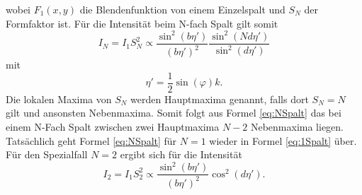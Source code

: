 wobei $F_1(x,y)$ die Blendenfunktion von einem Einzelspalt und $S_N$ der Formfaktor ist.
Für die Intensität beim N-fach Spalt gilt somit
\begin{equation}
	I_N = I_1 S_N^2 \propto \frac{\sin^2(b \eta')}{(b\eta')^2}\frac{\sin^2(N d \eta')}{\sin^2(d\eta')}\label{eq:NSpalt}
\end{equation}
mit
\begin{equation}
	\eta'=\frac{1}{2} \sin(\varphi) k.
\end{equation}
Die lokalen Maxima von $S_N$ werden Hauptmaxima genannt, falls dort $S_N=N$ gilt und ansonsten Nebenmaxima. Somit folgt aus Formel \eqref{eq:NSpalt} das bei einem N-Fach Spalt zwischen zwei Hauptmaxima $N-2$ Nebenmaxima liegen.
Tatsächlich geht Formel \eqref{eq:NSpalt} für $N=1$ wieder in Formel \eqref{eq:1Spalt} über.
Für den Spezialfall $N=2$ ergibt sich für die Intensität
\begin{equation}
	I_2=I_1 S_2^2\propto \frac{\sin^2(b \eta')}{(b\eta')^2} \cos^2(d \eta')\label{Jochen.3}.
\end{equation}
